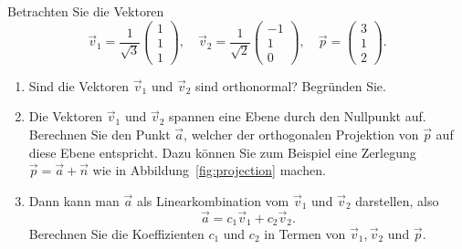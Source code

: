 \begin{aufgabe} \label{aufg:projection_3d}
	Betrachten Sie die Vektoren
	\begin{equation*}
		\vec v_1=\frac{1}{\sqrt{3}}\begin{pmatrix}
			1 \\ 1 \\ 1
		\end{pmatrix},\quad
		\vec v_2=\frac{1}{\sqrt{2}}\begin{pmatrix}
			-1 \\ 1 \\  0
		\end{pmatrix},\quad
		\vec p=\begin{pmatrix}
			3 \\ 1 \\  2
		\end{pmatrix}.
	\end{equation*}
	\begin{enumerate}[label=(\alph*)]
		\item Sind die Vektoren $\vec v_1$ und $\vec v_2$ sind orthonormal? Begründen Sie.
		\item Die Vektoren $\vec v_1$ und $\vec v_2$ spannen eine Ebene durch den Nullpunkt auf.
		Berechnen Sie den Punkt $\vec a$, welcher der orthogonalen Projektion von $\vec p$ auf diese Ebene entspricht.
		Dazu können Sie zum Beispiel eine Zerlegung $\vec p=\vec a+\vec n$ wie in Abbildung~\ref{fig:projection} machen.
		\item Dann kann man $\vec a$ als Linearkombination vom $\vec v_1$ und $\vec v_2$ darstellen, also
		\begin{equation*}
			\vec a=c_1\vec v_1+c_2\vec v_2.
		\end{equation*}
		Berechnen Sie die Koeffizienten $c_1$ und $c_2$ in Termen von $\vec v_1,\vec v_2$ und $\vec p$.
	\end{enumerate}
\end{aufgabe}
